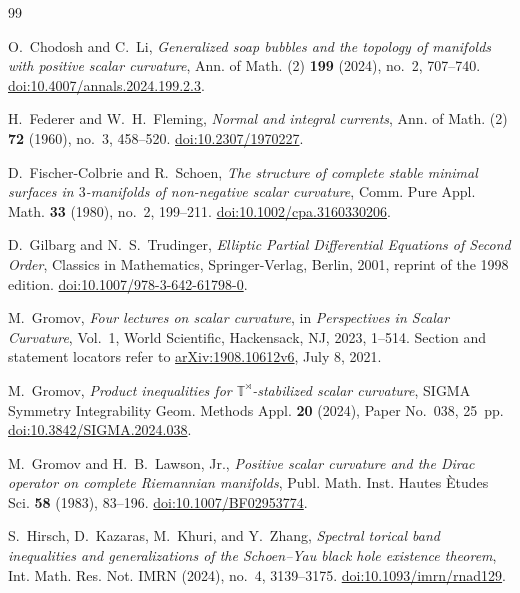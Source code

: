 \begin{thebibliography}{99}

O.~Chodosh and C.~Li,
\emph{Generalized soap bubbles and the topology of manifolds with positive
scalar curvature},
Ann. of Math. (2) \textbf{199} (2024), no.~2, 707--740.
\href{https://doi.org/10.4007/annals.2024.199.2.3}{doi:10.4007/annals.2024.199.2.3}.

H.~Federer and W.~H.~Fleming,
\emph{Normal and integral currents},
Ann. of Math. (2) \textbf{72} (1960), no.~3, 458--520.
\href{https://doi.org/10.2307/1970227}{doi:10.2307/1970227}.

D.~Fischer-Colbrie and R.~Schoen,
\emph{The structure of complete stable minimal surfaces in $3$-manifolds
of non-negative scalar curvature},
Comm. Pure Appl. Math. \textbf{33} (1980), no.~2, 199--211.
\href{https://doi.org/10.1002/cpa.3160330206}{doi:10.1002/cpa.3160330206}.

D.~Gilbarg and N.~S.~Trudinger,
\emph{Elliptic Partial Differential Equations of Second Order},
Classics in Mathematics, Springer-Verlag, Berlin, 2001,
reprint of the 1998 edition.
\href{https://doi.org/10.1007/978-3-642-61798-0}{doi:10.1007/978-3-642-61798-0}.

M.~Gromov,
\emph{Four lectures on scalar curvature},
in \emph{Perspectives in Scalar Curvature}, Vol.~1,
World Scientific, Hackensack, NJ, 2023, 1--514.
Section and statement locators refer to
\href{https://arxiv.org/abs/1908.10612v6}{arXiv:1908.10612v6},
July 8, 2021.

M.~Gromov,
\emph{Product inequalities for $\mathbb T^{\rtimes}$-stabilized scalar
curvature},
SIGMA Symmetry Integrability Geom. Methods Appl.
\textbf{20} (2024), Paper No.~038, 25~pp.
\href{https://doi.org/10.3842/SIGMA.2024.038}{doi:10.3842/SIGMA.2024.038}.

M.~Gromov and H.~B.~Lawson, Jr.,
\emph{Positive scalar curvature and the Dirac operator on complete
Riemannian manifolds},
Publ. Math. Inst. Hautes \`Etudes Sci. \textbf{58} (1983), 83--196.
\href{https://doi.org/10.1007/BF02953774}{doi:10.1007/BF02953774}.

S.~Hirsch, D.~Kazaras, M.~Khuri, and Y.~Zhang,
\emph{Spectral torical band inequalities and generalizations of the
Schoen--Yau black hole existence theorem},
Int. Math. Res. Not. IMRN (2024), no.~4, 3139--3175.
\href{https://doi.org/10.1093/imrn/rnad129}{doi:10.1093/imrn/rnad129}.


\end{thebibliography}
